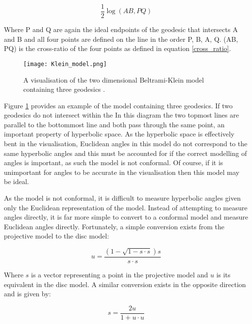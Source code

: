 \begin{equation}
\label{distance_projective_model}
\frac{1}{2}\log(AB,PQ)
\end{equation}

Where P and Q are again the ideal endpoints of the geodesic that intersects A and B and all four points are defined on the line in the order P, B, A, Q. (AB, PQ) is the cross-ratio of the four points as defined in equation \ref{cross_ratio}.

\begin{figure}
	\centering
	\texttt{[image: Klein\_model.png]}
	\caption[A visualisation of the two dimensional Beltrami-Klein model containing three geodesics]{A visualisation of the two dimensional Beltrami-Klein model containing three geodesics .}
	\label{fig:klein_example}
\end{figure}

Figure \ref{fig:klein_example} provides an example of the model containing three geodesics. If two geodesics do not intersect within the  In this diagram the two topmost lines are parallel to the bottommost line and both pass through the same point, an important property of hyperbolic space. As the hyperbolic space is effectively bent in the visualisation, Euclidean angles in this model do not correspond to the same hyperbolic angles and this must be accounted for if the correct modelling of angles is important, as such the model is not conformal. Of course, if it is unimportant for angles to be accurate in the visualisation then this model may be ideal.

As the model is not conformal, it is difficult to measure hyperbolic angles given only the Euclidean representation of the model. Instead of attempting to measure angles directly, it is far more simple to convert to a conformal model and measure Euclidean angles directly. Fortunately, a simple conversion exists from the projective model to the disc model:

\begin{equation}
\label{projective_to_disc}
u=\frac{(1-\sqrt{1-s\cdot{}s})s}{s\cdot{}s}
\end{equation}

Where $s$ is a vector representing a point in the projective model and $u$ is its equivalent in the disc model. A similar conversion exists in the opposite direction and is given by:

\begin{equation}
\label{disc_to_projective}
s=\frac{2u}{1+u\cdot{}u}
\end{equation}

